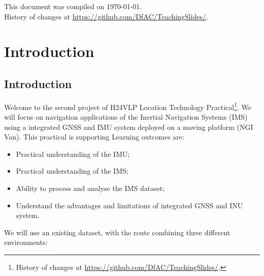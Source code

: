 \documentclass[11pt,fleqn]{book} %
\newcommand{\thisDocRef}{\footnote{History of changes at \url{https://github.com/DfAC/TeachingSlides/}.}}
\begin{document}
\noindent This document was compiled on \today. \\ 
History of changes at \url{https://github.com/DfAC/TeachingSlides/}.


\pagestyle{empty} %
\tableofcontents %

\cleardoublepage %
\pagestyle{fancy} %


\part{Introduction}


\chapter{Introduction}

Welcome to the second project of H24VLP Location Technology Practical\thisDocRef. We will focus on navigation applications of the Inertial Navigation Systems (IMS) using a integrated GNSS and IMU system deployed on a moving platform (NGI Van). This practical is supporting Learning outcomes are:

\begin{itemize}
	\item Practical understanding of the IMU;
	\item Practical understanding of the IMS;
	\item Ability to process and analyse the IMS dataset;
	\item Understand the advantages and limitations of integrated GNSS and INU system.

\end{itemize}

We will use an existing dataset, with the route combining three different environments:
\end{document}
